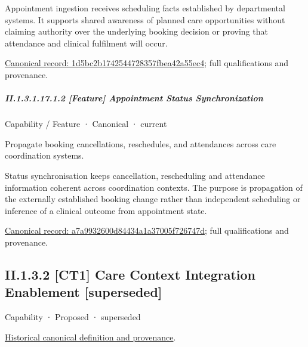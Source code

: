 Appointment ingestion receives scheduling facts established by departmental systems. It supports shared awareness of planned care opportunities without claiming authority over the underlying booking decision or proving that attendance and clinical fulfilment will occur.


{\footnotesize \href{../../../../continuum/strategy/capability/feature/1d5bc2b1742544728357fbea42a55ec4.md}{Canonical record: 1d5bc2b1742544728357fbea42a55ec4}; full qualifications and provenance.}\par
\subparagraph*{II.1.3.1.17.1.2 [Feature] Appointment Status Synchronization}
\label{navigation:II.1.3.1.17.1.2}

\label{element:a7a9932600d84434a1a37005f726747d}
{\small Capability / Feature · Canonical · current}\par

Propagate booking cancellations, reschedules, and attendances across care coordination systems.



Status synchronisation keeps cancellation, rescheduling and attendance information coherent across coordination contexts. The purpose is propagation of the externally established booking change rather than independent scheduling or inference of a clinical outcome from appointment state.


{\footnotesize \href{../../../../continuum/strategy/capability/feature/a7a9932600d84434a1a37005f726747d.md}{Canonical record: a7a9932600d84434a1a37005f726747d}; full qualifications and provenance.}\par
\subsection*{II.1.3.2 [CT1] Care Context Integration Enablement [superseded]}
\label{navigation:II.1.3.2}

\label{element:a84a7e96e7874a4b87d18c53b1b5cf29}
{\small Capability · Proposed · superseded}\par
\href{../../../../continuum/strategy/capability/a84a7e96e7874a4b87d18c53b1b5cf29.md}{Historical canonical definition and provenance}.\par
